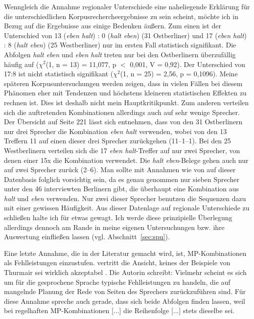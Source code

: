 Wenngleich die Annahme regionaler Unterschiede eine naheliegende Erklärung für die unterschiedlichen Korpusrechercheergebnisse zu sein scheint, möchte ich in Bezug auf die Ergebnisse aus \citet{Dittmar2000} einige Bedenken äußern. Zum einen ist der Unterschied von 13 (\textit{eben halt}) : 0 (\textit{halt eben}) (31 Ostberliner) und 17 (\textit{eben halt}) : 8 (\textit{halt eben}) (25 Westberliner) nur im ersten Fall statistisch signifikant. Die Abfolgen \textit{halt eben} und \textit{eben halt} treten nur bei den Ostberlinern überzufällig häufig auf ($\chi^{2}$(1, n = 13) = 11,077, p $<$ 0,001, V = 0,92). Der Unterschied von 17:8 ist nicht statistisch signifikant ($\chi^{2}$(1, n = 25) = 2,56, p = 0,1096). Meine späteren Korpusuntersuchungen werden zeigen, dass in vielen Fällen bei diesem Phänomen eher mit Tendenzen und höchstens kleineren statistischen Effekten zu rechnen ist. Dies ist deshalb nicht mein Hauptkritikpunkt. Zum anderen verteilen sich die auftretenden Kombinationen allerdings auch auf sehr wenige Sprecher. Der Übersicht auf Seite 221 lässt sich entnehmen, dass von den 31 Ost\-berlinern nur drei Sprecher die Kombination \textit{eben halt} verwenden, wobei von den 13 Treffern 11 auf einen dieser drei Sprecher zurückgehen (11–1–1). Bei den 25 Westberlinern verteilen sich die 17 \textit{eben halt}-Treffer auf nur zwei Sprecher, von denen einer 15x die Kombination verwendet. Die \textit{halt eben}-Belege gehen auch nur auf zwei Sprecher zurück (2–6). Man sollte mit Annahmen wie von \citet{Elspass2005} auf dieser Datenbasis folglich vorsichtig sein, da es genau genommen nur sieben Sprecher unter den 46 interviewten Berlinern gibt, die überhaupt eine Kombination aus \textit{halt} und \textit{eben} verwenden. Nur zwei dieser Sprecher benutzen die Sequenzen dazu mit einer gewissen Häufigkeit. Aus dieser Datenlage auf regionale Unterschiede zu schließen halte ich für etwas gewagt. Ich werde diese prinzipielle Überlegung allerdings dennoch am Rande in meine eigenen Untersuchungen bzw. ihre Auswertung einfließen lassen (vgl. Abschnitt~\ref{sec:spu}).

Eine letzte Annahme, die in der Literatur gemacht wird, ist, MP-Kombinationen als Fehlleistungen einzustufen. \citet[96]{Autenrieth2002} vertritt die Ansicht, keines der Beispiele von Thurmair sei \glqq wirklich\grqq{} akzeptabel . Die Autorin schreibt: \glqq Vielmehr scheint es sich um für die gesprochene Sprache typische \glq Fehlleistungen\grq {} zu handeln, die auf mangelnde Planung der Rede von Seiten des Sprechers zurückzuführen sind.\grqq{} Für diese Annahme spreche auch gerade, dass sich beide Abfolgen finden lassen, weil bei \glqq regelhaften MP-Kombinationen [...] die Reihenfolge [...] stets dieselbe\grqq{} sei.

